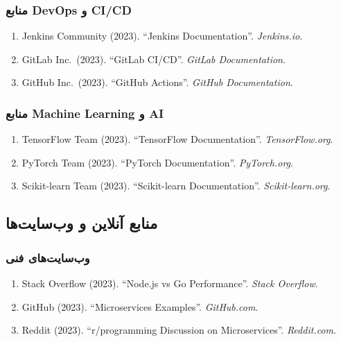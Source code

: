 \documentclass[
]{article}
\begin{document}
\subsubsection{منابع DevOps و
CI/CD}\label{ux645ux646ux627ux628ux639-devops-ux648-cicd}

\begin{enumerate}
\def\labelenumi{\arabic{enumi}.}
\setcounter{enumi}{54}
\item
  Jenkins Community (2023). ``Jenkins Documentation''.
  \emph{Jenkins.io}.
\item
  GitLab Inc.~(2023). ``GitLab CI/CD''. \emph{GitLab Documentation}.
\item
  GitHub Inc.~(2023). ``GitHub Actions''. \emph{GitHub Documentation}.
\end{enumerate}

\subsubsection{منابع Machine Learning و
AI}\label{ux645ux646ux627ux628ux639-machine-learning-ux648-ai}

\begin{enumerate}
\def\labelenumi{\arabic{enumi}.}
\setcounter{enumi}{57}
\item
  TensorFlow Team (2023). ``TensorFlow Documentation''.
  \emph{TensorFlow.org}.
\item
  PyTorch Team (2023). ``PyTorch Documentation''. \emph{PyTorch.org}.
\item
  Scikit-learn Team (2023). ``Scikit-learn Documentation''.
  \emph{Scikit-learn.org}.
\end{enumerate}

\subsection{منابع آنلاین و
وب‌سایت‌ها}\label{ux645ux646ux627ux628ux639-ux622ux646ux644ux627ux6ccux646-ux648-ux648ux628ux633ux627ux6ccux62aux647ux627}

\subsubsection{وب‌سایت‌های
فنی}\label{ux648ux628ux633ux627ux6ccux62aux647ux627ux6cc-ux641ux646ux6cc}

\begin{enumerate}
\def\labelenumi{\arabic{enumi}.}
\setcounter{enumi}{60}
\item
  Stack Overflow (2023). ``Node.js vs Go Performance''. \emph{Stack
  Overflow}.
\item
  GitHub (2023). ``Microservices Examples''. \emph{GitHub.com}.
\item
  Reddit (2023). ``r/programming Discussion on Microservices''.
  \emph{Reddit.com}.
\end{enumerate}
\end{document}
